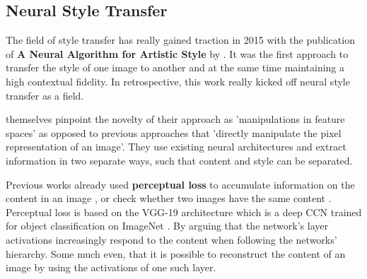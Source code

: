 



\subsection{Neural Style Transfer}
The field of style transfer has really gained traction in 2015 with the publication of \textbf{A Neural Algorithm for Artistic Style} by \citeauthor*{gatys}.
It was the first approach to transfer the style of one image to another and at the same time maintaining a high contextual fidelity.
In retrospective, this work really kicked off neural style transfer as a field.

\citeauthor*{gatys} themselves pinpoint the novelty of their approach as 'manipulations in feature spaces' as opposed to previous approaches that 'directly manipulate the pixel representation of an image'\cite{gatys}.
They use existing neural architectures and extract information in two separate ways, such that content and style can be separated.

Previous works already used \textbf{perceptual loss} to accumulate information on the content in an image \cite{percep_loss}, or check whether two images have the same content \cite{other_percep_loss}.
Perceptual loss is based on the VGG-19 architecture \cite{VGG} which is a deep CCN trained for object classification on ImageNet \cite{imagenet}.
By arguing that the network's layer activations increasingly respond to the content when following the networks' hierarchy.
Some much even, that it is possible to reconstruct the content of an image by using the activations of one such layer.


